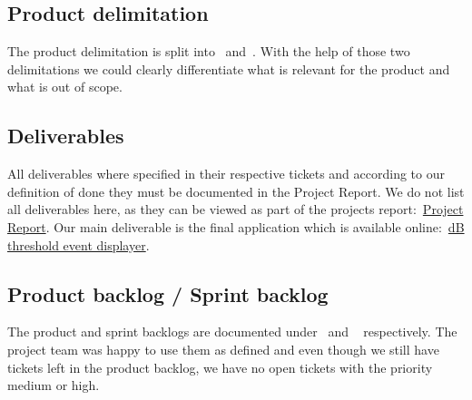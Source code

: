 \subsection{Product delimitation}\label{subsec:product-delimination-review}
The product delimitation is split into~ and~.
With the help of those two delimitations we could clearly differentiate what is relevant for the product and what is out of scope.

\subsection{Deliverables}\label{subsec:deliverables-review}
All deliverables where specified in their respective tickets and according to our definition of done they must be documented in the Project Report.
We do not list all deliverables here, as they can be viewed as part of the projects report:~\href{https://gitlab.ti.bfh.ch/decibel-threshold-event-displayer/decibel-threshold-event-displayer/-/raw/main/doc/report/report.pdf}{Project Report}.
Our main deliverable is the final application which is available online:~\href{https://decibel-threshold-event-displayer.github.io/#/}{dB threshold event displayer}.

\subsection{Product backlog / Sprint backlog}\label{subsec:backlogs-review}
The product and sprint backlogs are documented under~ and ~ respectively.
The project team was happy to use them as defined and even though we still have tickets left in the product backlog,
we have no open tickets with the priority medium or high.
